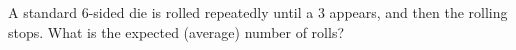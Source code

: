 A standard $6$-sided die is rolled repeatedly until a $3$ appears, and then the rolling stops. What is the expected (average) number of rolls?
